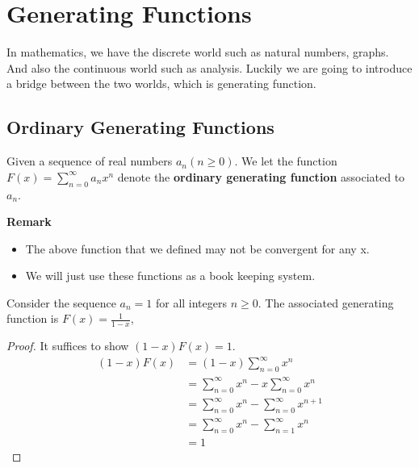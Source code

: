 \chapter{Generating Functions}

In mathematics, we have the discrete world such as natural numbers, graphs. And also the continuous world such as analysis. 
Luckily we are going to introduce a bridge between the two worlds, which is generating function. 

\section{Ordinary Generating Functions}
\begin{definition}
    Given a sequence of real numbers $a_n(n \geq 0)$. 
    We let the function $F(x)=\sum_{n=0}^{\infty}a_nx^n$ denote the \textbf{ordinary generating function} associated to $a_n$.
\end{definition}
\textbf{Remark}
\begin{itemize}
    \item The above function that we defined may not be convergent for any x.
    \item We will just use these functions as a book keeping system.
\end{itemize}

\begin{theorem}
    Consider the sequence $a_n=1$ for all integers $n \geq 0$. 
    The associated generating function is $F(x)=\frac{1}{1-x}$,
\end{theorem}
\begin{proof}
    It suffices to show $(1-x)F(x)=1$.
    \begin{equation}
        \begin{split}
            (1-x)F(x) &= (1-x)\sum_{n=0}^{\infty}x^n\\
            &= \sum_{n=0}^{\infty}x^n - x \sum_{n=0}^{\infty}x^n\\
            &= \sum_{n=0}^{\infty}x^n - \sum_{n=0}^{\infty}x^{n+1}\\
            &= \sum_{n=0}^{\infty}x^n - \sum_{n=1}^{\infty}x^n\\
            &= 1
        \end{split}
    \end{equation}
\end{proof}

